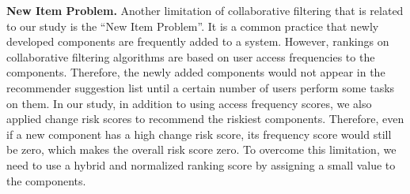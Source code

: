 	{\textbf{New Item Problem.}}	
	Another limitation of collaborative filtering that is related to
	our study is the ``New Item Problem''. It is a common practice that
	newly developed components are frequently added to a system. 
	However, rankings on collaborative filtering algorithms are 
        based on user access frequencies to the components. Therefore, 
        the newly added components would not appear in the recommender suggestion 
        list until a certain number of users perform some tasks on them. 
	In our study, in addition to using access frequency scores, 
    we also applied change risk scores to recommend the riskiest components.
	Therefore, even if a new component has a high change risk score,
    its frequency score would still be zero, which makes the overall 
    risk score zero. To overcome this limitation, we need
	to use a hybrid and normalized ranking score by assigning 
    a small value to the components.


 

